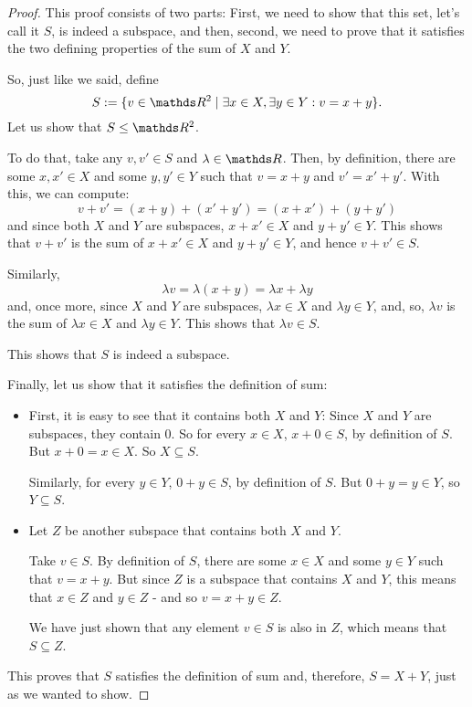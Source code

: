\begin{proof}
	This proof consists of two parts: First, we need to show that this set, let's call it $S$, is indeed a subspace, and then, second, we need to prove that it satisfies the two defining properties of the sum of $X$ and $Y$.
	
	So, just like we said, define
	\[S:=\{v\in \R^2\mid \exists x\in X,\exists y\in Y: v=x+y\}.\] Let us show that $S\leq \R^2$.
	
	To do that, take any $v,v'\in S$ and $\lambda \in \R$. Then, by definition, there are some $x,x'\in X$ and some $y,y'\in Y$ such that $v=x+y$ and $v'=x'+y'$. With this, we can compute:
	\[v+v'=(x+y)+(x'+y')=(x+x')+(y+y')\]and since both $X$ and $Y$ are subspaces, $x+x'\in X$ and $y+y'\in Y$. This shows that $v+v'$ is the sum of $x+x'\in X$ and $y+y'\in Y$, and hence $v+v'\in S$.
	
	Similarly,
	\[\lambda v=\lambda(x+y)=\lambda x+\lambda y\]and, once more, since $X$ and $Y$ are subspaces, $\lambda x\in X$ and $\lambda y\in Y$, and, so, $\lambda v$ is the sum of $\lambda x\in X$ and $\lambda y\in Y$. This shows that $\lambda v\in S$.
	
	This shows that $S$ is indeed a subspace.
	
	\bigskip
	Finally, let us show that it satisfies the definition of sum:
	\begin{itemize}
		\item First, it is easy to see that it contains both $X$ and $Y$: Since $X$ and $Y$ are subspaces, they contain 0. So for every $x\in X$, $x+0\in S$, by definition of $S$. But $x+0=x\in X$. So $X\subseteq S$.
		
		Similarly, for every $y\in Y$, $0+y\in S$, by definition of $S$. But $0+y=y\in Y$, so $Y\subseteq S$.
		
		\item Let $Z$ be another subspace that contains both $X$ and $Y$. 
		
		Take $v\in S$. By definition of $S$, there are some $x\in X$ and 	some $y\in Y$ such that $v=x+y$. But since $Z$ is a subspace that contains $X$ and $Y$, this means that $x\in Z$ and $y\in Z$ - and so $v=x+y\in Z$.
		
		We have just shown that any element $v\in S$ is also in $Z$, which means that $S\subseteq Z$.
	\end{itemize}

This proves that $S$ satisfies the definition of sum and, therefore, $S=X+Y$, just as we wanted to show.
\end{proof}

